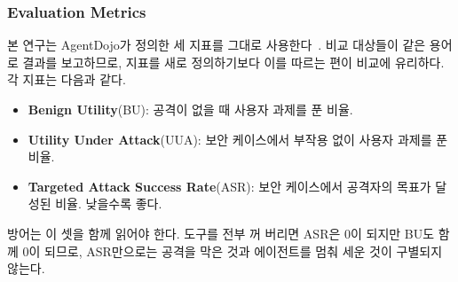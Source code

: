 \documentclass[acmsmall,screen,review,anonymous]{acmart}
\begin{document}
\subsubsection{Evaluation Metrics}

본 연구는 AgentDojo가 정의한 세 지표를 그대로 사용한다~\cite{debenedetti2024agentdojo}. 비교 대상들이 같은 용어로 결과를 보고하므로, 지표를 새로 정의하기보다 이를 따르는 편이 비교에 유리하다. 각 지표는 다음과 같다.

\begin{itemize}
    \item \textbf{Benign Utility}(BU): 공격이 없을 때 사용자 과제를 푼 비율.
    \item \textbf{Utility Under Attack}(UUA): 보안 케이스에서 부작용 없이 사용자 과제를 푼 비율.
    \item \textbf{Targeted Attack Success Rate}(ASR): 보안 케이스에서 공격자의 목표가 달성된 비율. 낮을수록 좋다.
\end{itemize}

방어는 이 셋을 함께 읽어야 한다. 도구를 전부 꺼 버리면 ASR은 0이 되지만 BU도 함께 0이 되므로, ASR만으로는 공격을 막은 것과 에이전트를 멈춰 세운 것이 구별되지 않는다.
\end{document}
